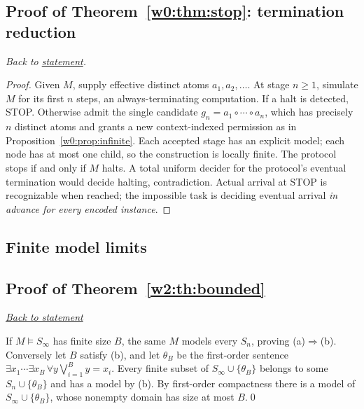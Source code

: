 \documentclass[11pt,letterpaper]{article}
\theoremstyle{definition}\newtheorem{definition}[theorem]{Definition}\newtheorem{example}[theorem]{Example}
\theoremstyle{remark}\newtheorem{remark}[theorem]{Remark}
\newcommand{\backlink}[1]{\noindent\hyperref[#1]{\textit{Back to statement}}\par\smallskip}
\begin{document}
\subsection{Proof of Theorem~\ref{w0:thm:stop}: termination reduction}\label{w0:pr:stop}
\textit{Back to \hyperref[w0:thm:stop]{statement}.}
\begin{proof}
Given $M$, supply effective distinct atoms $a_1,a_2,\ldots$. At stage $n\ge1$, simulate $M$ for its first $n$ steps, an always-terminating computation. If a halt is detected, STOP. Otherwise admit the single candidate $g_n=a_1\circ\cdots\circ a_n$, which has precisely $n$ distinct atoms and grants a new context-indexed permission as in Proposition~\ref{w0:prop:infinite}. Each accepted stage has an explicit model; each node has at most one child, so the construction is locally finite. The protocol stops if and only if $M$ halts. A total uniform decider for the protocol's eventual termination would decide halting, contradiction. Actual arrival at STOP is recognizable when reached; the impossible task is deciding eventual arrival \emph{in advance for every encoded instance}.
\end{proof}


\subsection*{Finite model limits}

\subsection{Proof of Theorem~\ref{w2:th:bounded}}\label{w2:pr:bounded}\backlink{w2:th:bounded}
If $M\models S_\infty$ has finite size $B$, the same $M$ models every $S_n$, proving (a)$\Rightarrow$(b). Conversely let $B$ satisfy (b), and let $\theta_B$ be the first-order sentence $\exists x_1\cdots\exists x_B\,\forall y\bigvee_{i=1}^B y=x_i$. Every finite subset of $S_\infty\cup\{\theta_B\}$ belongs to some $S_n\cup\{\theta_B\}$ and has a model by (b). By first-order compactness there is a model of $S_\infty\cup\{\theta_B\}$, whose nonempty domain has size at most $B$.\qed
\end{document}
